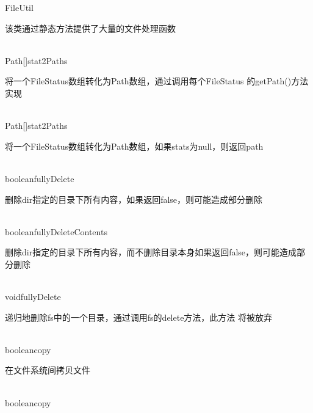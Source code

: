 \begin{XeClass}{FileUtil}
   
 该类通过静态方法提供了大量的文件处理函数

  \begin{XeMethod}{\XePublic\\ }{Path[]}{stat2Paths}
       
 将一个FileStatus数组转化为Path数组，通过调用每个FileStatus
 的getPath()方法实现

  \end{XeMethod}

  \begin{XeMethod}{\XePublic\\ }{Path[]}{stat2Paths}
       
 将一个FileStatus数组转化为Path数组，如果stats为null，则返回path

  \end{XeMethod}

  \begin{XeMethod}{\XePublic\\ }{boolean}{fullyDelete}
       
 删除dir指定的目录下所有内容，如果返回false，则可能造成部分删除

  \end{XeMethod}

  \begin{XeMethod}{\XePublic\\ }{boolean}{fullyDeleteContents}
       
 删除dir指定的目录下所有内容，而不删除目录本身如果返回false，则可能造成部分删除

  \end{XeMethod}

  \begin{XeMethod}{\XePublic\\ }{void}{fullyDelete}
       
 递归地删除fs中的一个目录，通过调用fs的delete方法，此方法
 将被放弃

  \end{XeMethod}

  \begin{XeMethod}{\XePublic\\ }{boolean}{copy}
       
 在文件系统间拷贝文件

  \end{XeMethod}

  \begin{XeMethod}{\XePublic\\ }{boolean}{copy}
       

\end{XeMethod}
\end{XeClass}
